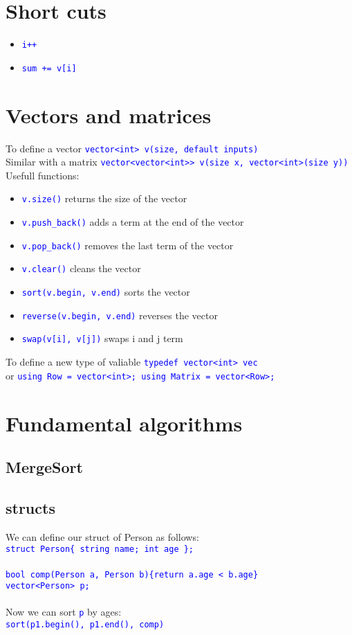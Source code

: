 \documentclass[12pt]{article}
\newcommand{\code}[1]{\colorbox{light-gray}{\texttt{\textcolor{blue}{#1}}}}
\begin{document}
\section{Short	cuts}
\begin{itemize}
	\item \code{i++}
	\item \code{sum += v[i]}
\end{itemize}

\section{Vectors and matrices}
To define a vector \code{vector<int> v(size, default inputs)} \\
Similar with a matrix \code{vector<vector<int>> v(size x, vector<int>(size y))} \\
Usefull functions:
\begin{itemize}
	\item \code{v.size()} returns the size of the vector
	\item \code{v.push\_back()} adds a term at the end of the vector
	\item \code{v.pop\_back()}  removes the last term of the vector
	\item \code{v.clear()} cleans the vector
	\item \code{sort(v.begin, v.end)} sorts the vector
	\item \code{reverse(v.begin, v.end)} reverses the vector
	\item \code{swap(v[i], v[j])} swaps i and j term
\end{itemize}
To define a new type of valiable \code{typedef vector<int> vec} \\ or \code{using Row = vector<int>; using Matrix = vector<Row>;}

\section{Fundamental algorithms}
	\subsection{MergeSort}
	
	\subsection{structs}
	We can define our struct of Person as follows:\\
	\code{struct Person\{ string name; int age \};} \\ \\
	\code{bool comp(Person a, Person b)\{return a.age < b.age\} }\\
	\code{vector<Person> p;}\\
	\\
	Now we can sort \code{p} by ages: \\
	\code{sort(p1.begin(), p1.end(), comp)}
	
\end{document}
